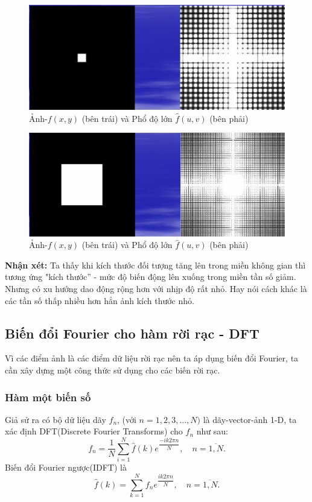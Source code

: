 \documentclass[12pt,a4paper]{report}
\numberwithin{equation}{section}
\theoremstyle{definition} %
\begin{document}
		  \begin{figure}[H]
			\centering
			\includegraphics[width = 0.8\linewidth]{img/anhVaphodolon3.png}
			\caption{Ảnh-$f(x,y)$ (bên trái) và Phổ độ lớn $\hat{f}(u,v)$ (bên phải)}
		 \end{figure}
		  \begin{figure}[H]
			\centering
			\includegraphics[width = 0.8\linewidth]{img/anhVaphodolon4.png}
			\caption{Ảnh-$f(x,y)$ (bên trái) và Phổ độ lớn $\hat{f}(u,v)$ (bên phải)}
		 \end{figure}

		 \textbf{Nhận xét:} Ta thấy khi kích thước đối tượng tăng lên trong miền không gian thì tương ứng "kích thước'' - mức độ biến động lên xuống trong miền tần số giảm. Nhưng có xu hướng dao động rộng hơn với nhịp độ rất nhỏ. Hay nói cách khác là các tần số thấp nhiều hơn hẳn ảnh kích thước nhỏ.


\subsection{Biến đổi Fourier cho hàm rời rạc - DFT}

Vì các điểm ảnh là các điểm dữ liệu rời rạc nên ta áp dụng biến đổi Fourier, ta cần xây dựng một công thức sử dụng cho các biến rời rạc.

\subsubsection{Hàm một biến số}

Giả sử ra có bộ dữ liệu dãy $f_n$, (với $n= 1,2,3,...,N)$ là dãy-vector-ảnh 1-D, ta xác định DFT(Discrete Fourier Transforms) cho $f_n$ như sau: 
\begin{equation}
	\label{144}
    f_n= \dfrac{1}{N}\sum_{i=1}^N\hat{f}(k)e^{\dfrac{-ik2\pi n}{N}},\quad n=\overline{1,N}.
\end{equation}
Biến đổi Fourier ngược(IDFT) là
\begin{equation}
	\label{145}
    \hat{f}(k) =\sum_{k=1}^Nf_ne^{\dfrac{ik2\pi n}{N}},\quad n=\overline{1,N}.
\end{equation}
\end{document}
